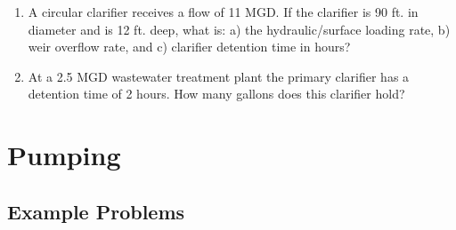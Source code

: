 \begin{enumerate}


\item A circular clarifier receives a flow of 11 MGD.  If the clarifier is 90 ft. in diameter and is 12 ft. deep, what is: a) the hydraulic/surface loading rate, b) weir overflow rate, and c) clarifier detention time in hours?\\

\item At a 2.5 MGD wastewater treatment plant the primary clarifier has a detention time of 2 hours. How many gallons does this clarifier hold?\\

\end{enumerate}

\newpage

\section{Pumping}

\subsection{Example Problems} 


